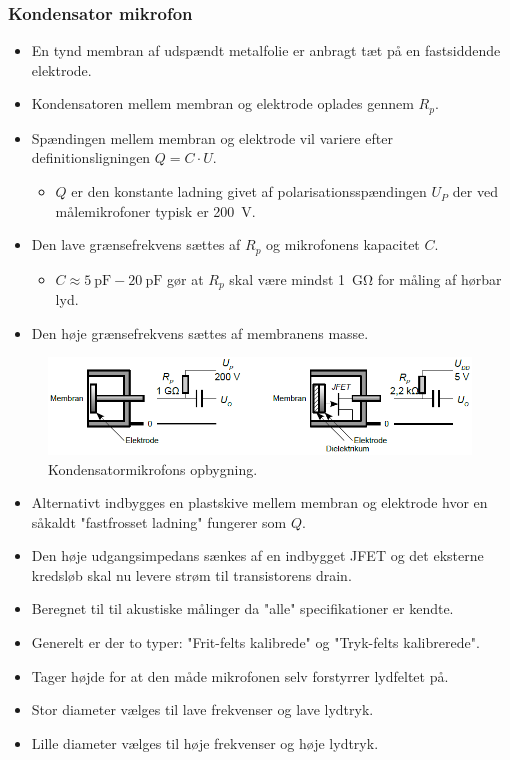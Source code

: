 \subsubsection{Kondensator mikrofon}
\begin{itemize}
	\item En tynd membran af udspændt metalfolie er anbragt tæt på
	en fastsiddende elektrode.
	\item Kondensatoren mellem membran og elektrode oplades gennem $R_p$. 
	\item Spændingen mellem membran og elektrode vil variere efter definitionsligningen $Q = C\cdot U$.
	\begin{itemize}
		\item $Q$ er den konstante ladning givet af polarisationsspændingen $U_P$ der ved målemikrofoner typisk er \SI{200}{\volt}.
	\end{itemize}
	\item Den lave grænsefrekvens sættes af $R_p$ og mikrofonens kapacitet $C$.
	\begin{itemize}
		\item $C \approx \SI{5}{\pico\farad}-\SI{20}{\pico\farad}$ gør at  $R_p$ skal være mindst \SI{1}{\giga\ohm} for måling af hørbar lyd.
	\end{itemize}
	\item Den høje grænsefrekvens sættes af membranens masse. 
\end{itemize}

\begin{figure} [H]
	\centering
	\includegraphics[width=.85\linewidth]{graphics/11.png}
	\caption{Kondensatormikrofons opbygning.}
	\label{fig:11}
\end{figure}

\begin{itemize}
	\item Alternativt indbygges en plastskive mellem membran og elektrode hvor en såkaldt "fastfrosset ladning" fungerer som $Q$.
	\item Den høje udgangsimpedans sænkes af en indbygget JFET og det eksterne kredsløb skal nu levere strøm til transistorens drain.
	\item Beregnet til til akustiske målinger da "alle" specifikationer er kendte.
	\item Generelt er der to typer: "Frit-felts kalibrede" og "Tryk-felts kalibrerede".
	\item Tager højde for at den måde mikrofonen selv forstyrrer lydfeltet på.
	\item Stor diameter vælges til lave frekvenser og lave lydtryk.
	\item Lille diameter vælges til høje frekvenser og høje lydtryk.
\end{itemize}

